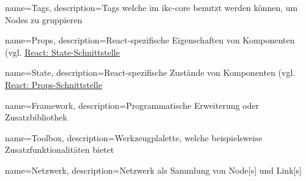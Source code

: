 {
    name=Tags,
    description={Tags welche im \gls{ikc-core} benutzt werden können, um Nodes zu gruppieren}
}

{
    name=Props,
    description={React-spezifische Eigenschaften von Komponenten (vgl. \hyperref[props]{React: State-Schnittstelle}}
}

{
    name=State,
    description={React-spezifische Zustände von Komponenten (vgl. \hyperref[props]{React: Props-Schnittstelle}}
}

{
    name=Framework,
    description={Programmatische Erweiterung oder Zusatzbibliothek}
}

{
    name=Toolbox,
    description={Werkzeugplalette, welche beispielsweise Zu\-satz\-funk\-tio\-na\-li\-tät\-en bietet}
}

{
    name=Netzwerk,
    description={Netzwerk als Sammlung von \gls{Node}[s] und \gls{Link}[s]}
}

\renewcommand{\glstextformat}[1]{\textbf{\itshape #1}}




